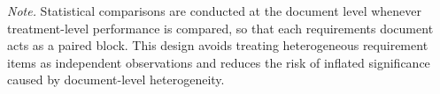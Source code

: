 \begin{table}[t]
{\begin{tabular}{p{1.1cm}p{3.1cm}p{4.1cm}p{3.7cm}p{3.0cm}}
\bottomrule
\end{tabular}%
}

\vspace{0.4em}
\begin{minipage}{0.97\textwidth}
\footnotesize
\textit{Note.} Statistical comparisons are conducted at the document level whenever treatment-level performance is compared, so that each requirements document acts as a paired block. This design avoids treating heterogeneous requirement items as independent observations and reduces the risk of inflated significance caused by document-level heterogeneity.
\end{minipage}
\end{table}
